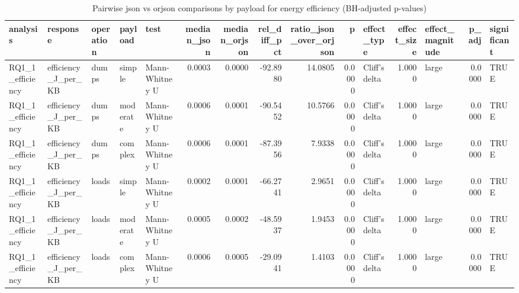 \begin{table}[ht]
\centering
\begin{tabular}{lllllrrrrrlrlrl}
  \toprule
analysis & response & operation & payload & test & median\_json & median\_orjson & rel\_diff\_pct & ratio\_json\_over\_orjson & p & effect\_type & effect\_size & effect\_magnitude & p\_adj & significant \\ 
  \midrule
RQ1\_1\_efficiency & efficiency\_J\_per\_KB & dumps & simple & Mann-Whitney U & 0.0003 & 0.0000 & -92.8980 & 14.0805 & 0.0000 & Cliff's delta & 1.0000 & large & 0.0000 & TRUE \\ 
  RQ1\_1\_efficiency & efficiency\_J\_per\_KB & dumps & moderate & Mann-Whitney U & 0.0006 & 0.0001 & -90.5452 & 10.5766 & 0.0000 & Cliff's delta & 1.0000 & large & 0.0000 & TRUE \\ 
  RQ1\_1\_efficiency & efficiency\_J\_per\_KB & dumps & complex & Mann-Whitney U & 0.0006 & 0.0001 & -87.3956 & 7.9338 & 0.0000 & Cliff's delta & 1.0000 & large & 0.0000 & TRUE \\ 
  RQ1\_1\_efficiency & efficiency\_J\_per\_KB & loads & simple & Mann-Whitney U & 0.0002 & 0.0001 & -66.2741 & 2.9651 & 0.0000 & Cliff's delta & 1.0000 & large & 0.0000 & TRUE \\ 
  RQ1\_1\_efficiency & efficiency\_J\_per\_KB & loads & moderate & Mann-Whitney U & 0.0005 & 0.0002 & -48.5937 & 1.9453 & 0.0000 & Cliff's delta & 1.0000 & large & 0.0000 & TRUE \\ 
  RQ1\_1\_efficiency & efficiency\_J\_per\_KB & loads & complex & Mann-Whitney U & 0.0006 & 0.0005 & -29.0941 & 1.4103 & 0.0000 & Cliff's delta & 1.0000 & large & 0.0000 & TRUE \\ 
   \bottomrule
\end{tabular}
\caption{Pairwise json vs orjson comparisons by payload for energy efficiency (BH-adjusted p-values)} 
\label{tab:RQ1_1_efficiency_pairwise}
\end{table}
